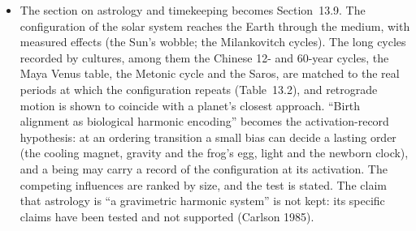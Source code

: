 \documentclass[11pt,a4paper]{article}
\begin{document}
\begin{itemize}
  \item The section on astrology and timekeeping becomes Section~13.9. The configuration of the solar system reaches the Earth through the medium, with measured effects (the Sun's wobble; the Milankovitch cycles). The long cycles recorded by cultures, among them the Chinese 12- and 60-year cycles, the Maya Venus table, the Metonic cycle and the Saros, are matched to the real periods at which the configuration repeats (Table~13.2), and retrograde motion is shown to coincide with a planet's closest approach. ``Birth alignment as biological harmonic encoding'' becomes the activation-record hypothesis: at an ordering transition a small bias can decide a lasting order (the cooling magnet, gravity and the frog's egg, light and the newborn clock), and a being may carry a record of the configuration at its activation. The competing influences are ranked by size, and the test is stated. The claim that astrology is ``a gravimetric harmonic system'' is not kept: its specific claims have been tested and not supported (Carlson 1985).
\end{itemize}
\end{document}
